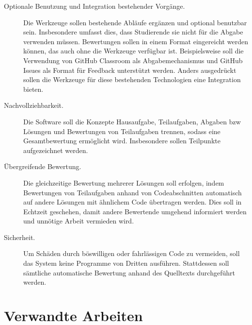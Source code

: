 \begin{description}
    \item[Optionale Benutzung und Integration bestehender Vorgänge.]
    Die Werkzeuge sollen bestehende Abläufe ergänzen und optional benutzbar sein.
    Insbesondere umfasst dies, dass Studierende sie nicht für die Abgabe verwenden müssen.
    Bewertungen sollen in einem Format eingereicht werden können, das auch ohne die Werkzeuge verfügbar ist.
    Beispielsweise soll die Verwendung von GitHub Classroom als Abgabemechanismus und GitHub Issues als Format für Feedback unterstützt werden.
    Anders ausgedrückt sollen die Werkzeuge für diese bestehenden Technologien eine Integration bieten.
    \item[Nachvollziehbarkeit.]
    Die Software soll die Konzepte Hausaufgabe, Teilaufgaben, Abgaben \ac{bzw} Lösungen und Bewertungen von Teilaufgaben trennen, sodass eine Gesamtbewertung ermöglicht wird.
    Insbesondere sollen Teilpunkte aufgezeichnet werden.
    \item[Übergreifende Bewertung.]
    Die gleichzeitige Bewertung mehrerer Lösungen soll erfolgen, indem Bewertungen von Teilaufgaben anhand von Codeabschnitten automatisch auf andere Lösungen mit ähnlichem Code übertragen werden.
    Dies soll in Echtzeit geschehen, damit andere Bewertende umgehend informiert werden und unnötige Arbeit vermieden wird.
    \item[Sicherheit.]
    Um Schäden durch böswilligen oder fahrlässigen Code zu vermeiden, soll das System keine Programme von Dritten ausführen.
    Stattdessen soll sämtliche automatische Bewertung anhand des Quelltexts durchgeführt werden.
\end{description}

\section{Verwandte Arbeiten}\label{sec:related-work}

